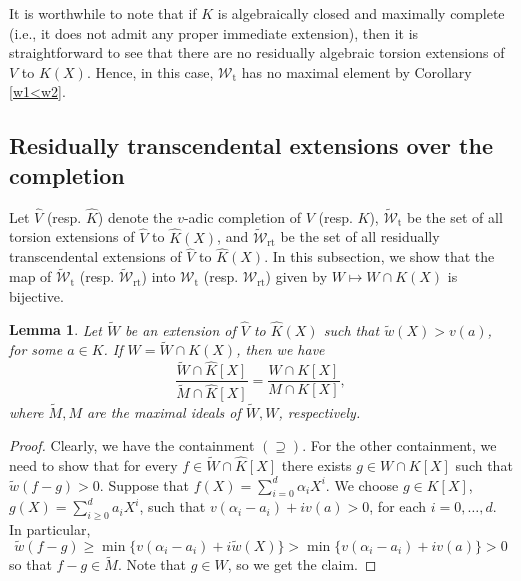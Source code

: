 \documentclass[10pt]{article}
\numberwithin{equation}{section}
\newtheorem{Lem}[equation]{Lemma}
\theoremstyle{definition}
\theoremstyle{definition}
\newcommand{\K}{\widehat{K}}
\newcommand{\V}{\widehat{V}}
\newcommand{\rt}{\text{rt}}
\renewcommand{\t}{\text{t}}
\newcommand{\wW}{\widetilde{W}}
\newcommand{\wM}{\widetilde{M}}
\begin{document}
It is worthwhile to note that if $K$ is algebraically closed and maximally complete (i.e., it does not admit any proper immediate extension), then it is straightforward to see that there are no residually algebraic torsion extensions of $V$ to $K(X)$.
Hence, in this case, $\mathcal W_{\t}$ has no maximal element by Corollary \ref{w1<w2}.


\subsection{Residually transcendental extensions over the completion}\label{res transc completion}



\bigskip

Let $\V$ (resp. $\K$) denote the $v$-adic completion of $V$ (resp. $K$), 
$\widetilde{\mathcal W}_{\t}$ be the set of all torsion extensions of $\V$  to $\K(X)$,
and $\widetilde{\mathcal W}_{\rt}$ be the set of all residually transcendental 
extensions of $\V$ to $\K(X)$. In this subsection,
we show that the map of $\widetilde{\mathcal W}_{\t}$ (resp. $\widetilde{\mathcal W}_{\rt}$)
into $\mathcal W_{\t}$ (resp. $\mathcal W_{\rt}$) given by $W \mapsto W \cap K(X)$ is bijective.


\begin{Lem}\label{contraction valuation}
Let $\wW$ be an extension of $\V$ to $\K(X)$ such that  $\tilde w(X)>v(a)$, for some $a\in K$. If $W=\wW\cap K(X)$, then we have
$$\frac{\wW\cap\K[X]}{\wM\cap\K[X]}=\frac{W\cap K[X]}{M\cap K[X]},$$
where $\wM,M$ are the maximal ideals of $\wW,W$, respectively.
\end{Lem}


\begin{proof}
Clearly, we have the containment $(\supseteq)$. For the other containment, 
we need to show that for every $f\in \wW\cap\K[X]$ there exists $g\in W\cap K[X]$ such that $\tilde w(f-g)>0$. 
Suppose that $f(X)=\sum\limits_{i= 0}^d \alpha_i X^i$. We choose $g\in K[X]$, $g(X)=\sum\limits_{i\geq0}^d a_i X^i$,
such that $v(\alpha_i-a_i)+iv(a)>0$, for each $i = 0,\ldots,d$. In particular,
\begin{equation}\label{f-g}
\tilde w(f-g)\geq \min\{v(\alpha_i-a_i)+i\tilde w(X)\}>\min\{v(\alpha_i-a_i)+iv(a)\}>0
\end{equation}
so that $f-g\in\wM$. Note that $g\in W$, so we get the claim.
\end{proof}
\end{document}
